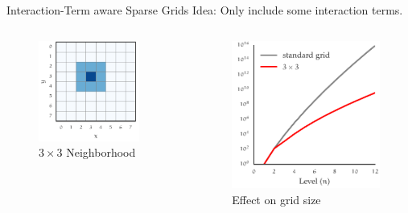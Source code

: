 \documentclass{beamer}
\begin{document}
\begin{frame}{Interaction-Term aware Sparse Grids}
  Idea: Only include some interaction terms. 
  \begin{columns}[b]
  \begin{column}{0.5\textwidth}
  \begin{figure}[H]
    \centering
    \includegraphics[width=0.9\textwidth]{nn_l2}
    \caption{\(3 \times 3\) Neighborhood}
  \end{figure}
  \end{column}
  \begin{column}{0.5\textwidth}
    \begin{figure}[H]
      \centering
      \includegraphics[width=1.0\textwidth]{interaction_sizes}
      \caption{Effect on grid size}
    \end{figure}
  \end{column}  \end{columns}
\end{frame}
\end{document}
